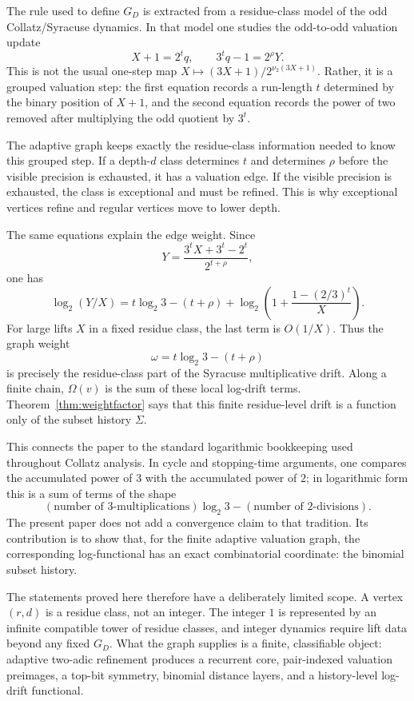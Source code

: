 \documentclass[11pt]{amsart}
\theoremstyle{definition}
\theoremstyle{remark}
\begin{document}
The rule used to define $G_D$ is extracted from a residue-class model of the odd Collatz/Syracuse dynamics.  In that model one studies the odd-to-odd valuation update
\[
X+1=2^tq,
\qquad
3^tq-1=2^\rho Y.
\]
This is not the usual one-step map $X\mapsto (3X+1)/2^{\nu_2(3X+1)}$.  Rather, it is a grouped valuation step: the first equation records a run-length $t$ determined by the binary position of $X+1$, and the second equation records the power of two removed after multiplying the odd quotient by $3^t$.

The adaptive graph keeps exactly the residue-class information needed to know this grouped step.  If a depth-$d$ class determines $t$ and determines $\rho$ before the visible precision is exhausted, it has a valuation edge.  If the visible precision is exhausted, the class is exceptional and must be refined.  This is why exceptional vertices refine and regular vertices move to lower depth.

The same equations explain the edge weight.  Since
\[
Y=\frac{3^tX+3^t-2^t}{2^{t+\rho}},
\]
one has
\[
\log_2(Y/X)
=
t\log_2 3-(t+\rho)
+
\log_2\!\left(1+\frac{1-(2/3)^t}{X}\right).
\]
For large lifts $X$ in a fixed residue class, the last term is $O(1/X)$.  Thus the graph weight
\[
\omega=t\log_2 3-(t+\rho)
\]
is precisely the residue-class part of the Syracuse multiplicative drift.  Along a finite chain, $\Omega(v)$ is the sum of these local log-drift terms.  Theorem~\ref{thm:weightfactor} says that this finite residue-level drift is a function only of the subset history $\Sigma$.

This connects the paper to the standard logarithmic bookkeeping used throughout Collatz analysis.  In cycle and stopping-time arguments, one compares the accumulated power of $3$ with the accumulated power of $2$; in logarithmic form this is a sum of terms of the shape
\[
(\text{number of }3\text{-multiplications})\log_2 3
-
(\text{number of }2\text{-divisions}).
\]
The present paper does not add a convergence claim to that tradition.  Its contribution is to show that, for the finite adaptive valuation graph, the corresponding log-functional has an exact combinatorial coordinate: the binomial subset history.

The statements proved here therefore have a deliberately limited scope.  A vertex $(r,d)$ is a residue class, not an integer.  The integer $1$ is represented by an infinite compatible tower of residue classes, and integer dynamics require lift data beyond any fixed $G_D$.  What the graph supplies is a finite, classifiable object: adaptive two-adic refinement produces a recurrent core, pair-indexed valuation preimages, a top-bit symmetry, binomial distance layers, and a history-level log-drift functional.
\end{document}
